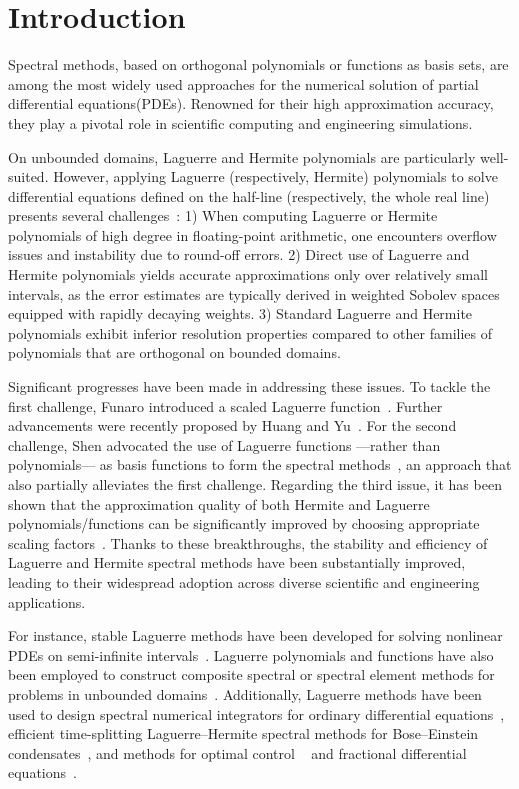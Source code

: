 \documentclass[pdflatex,sn-aps]{sn-jnl}%
\theoremstyle{thmstyleone}%
\theoremstyle{thmstyletwo}%
\theoremstyle{thmstylethree}%
\begin{document}
\section{Introduction}
Spectral methods, based on orthogonal polynomials or functions as basis sets, are among the most widely used approaches for the numerical solution of partial differential equations(PDEs). Renowned for their high approximation accuracy, they play a pivotal role in scientific computing and engineering simulations.

On unbounded domains, Laguerre and Hermite polynomials are particularly well-suited. However, applying Laguerre (respectively, Hermite) polynomials to solve differential equations defined on the half-line (respectively, the whole real line) presents several challenges~\cite{gottlieb_numerical_1977,funaro1989computational,shen2000stable}:
1) When computing Laguerre or Hermite polynomials of high degree in floating-point arithmetic, one encounters overflow issues and instability due to round-off errors. 
2) Direct use of Laguerre and Hermite polynomials yields accurate approximations only over relatively small intervals, as the error estimates are typically derived in weighted Sobolev spaces equipped with rapidly decaying weights. 
3) Standard Laguerre and Hermite polynomials exhibit inferior resolution properties compared to other families of polynomials that are orthogonal on bounded domains.

Significant progresses have been made in addressing these issues. To tackle the first challenge, Funaro introduced a scaled Laguerre function~\cite{funaro1989computational}. Further advancements were recently proposed by Huang and Yu~\cite{huang2024improved}. For the second challenge, Shen advocated the use of Laguerre functions ---rather than polynomials--- as basis functions to form the spectral methods~\cite{shen2000stable}, an approach that also partially alleviates the first challenge. Regarding the third issue, it has been shown that the approximation quality of both Hermite and Laguerre polynomials/functions can be significantly improved by choosing appropriate scaling factors~\cite{tang1993hermite,shen2000stable}.
Thanks to these breakthroughs, the stability and efficiency of Laguerre and Hermite spectral methods have been substantially improved, leading to their widespread adoption across diverse scientific and engineering applications.

For instance, stable Laguerre methods have been developed for solving nonlinear PDEs on semi-infinite intervals~\cite{guo2000laguerre}.
Laguerre polynomials and functions have also been employed to construct composite spectral or spectral element methods for problems in unbounded domains~\cite{wang2008composite,guo2001composite,xu2002mixed,shen2006laguerre,azaiez2009laguerre,chen2012new,shen2016efficient}.
Additionally, Laguerre methods have been used to design spectral numerical integrators for ordinary differential equations~\cite{ben2007numerical,guo2008integration}, efficient time-splitting Laguerre--Hermite spectral methods for Bose--Einstein condensates~\cite{bao_fourth-order_2005, bao2008generalized}, and methods for optimal control
~\cite{masoumnezhad2020laguerre} and fractional differential equations~\cite{bhrawy2014efficient,chen2018laguerre}.
\end{document}
